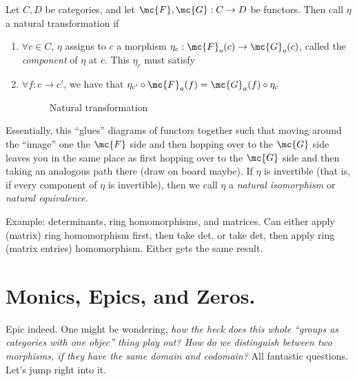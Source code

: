 \documentclass{fkbook}
\begin{document}
\begin{definition}
  Let $C,D$ be categories, and let $\mc{F}, \mc{G} : C \to D$ be
  functors. Then call $\eta$ a natural transformation if
  \begin{enumerate}[label=\arabic*)]
    \item $\forall c \in C$, $\eta$ assigns to $c$ a morphism $\eta_c
      : \mc{F}_o(c) \to \mc{G}_o(c)$, called the \emph{component} of
      $\eta$ at $c$. This $\eta_c$ must satisfy
    \item $\forall f : c \to c'$, we have that $\eta_{c'} \circ
      \mc{F}_a(f) = \mc{G}_a(f) \circ \eta_c$
      \begin{figure}[H]
        \centering
        \caption{Natural transformation}
      \end{figure}
  \end{enumerate}
\end{definition}
Essentially, this ``glues'' diagrams of functors together such that
moving around the ``image'' one the $\mc{F}$ side and then hopping
over to the $\mc{G}$ side leaves you in the same place as first
hopping over to the $\mc{G}$ side and then taking an analogous path
there (draw on board maybe). If $\eta$ is invertible (that is, if
every component of $\eta$ is invertible), then we call $\eta$ a
\emph{natural isomorphism} or \emph{natural equivalence}.

Example: determinants, ring homomorphisms, and matrices. Can either
apply (matrix) ring homomorphism first, then take det, or take det,
then apply ring (matrix entries) homomorphism. Either gets the same
result.

\section{Monics, Epics, and Zeros.}
Epic indeed. One might be wondering, \emph{how the heck does this
  whole ``groups as categories with one objec'' thing play out? How do
we distinguish between two morphisms, if they have the same domain and
codomain?} All fantastic questions. Let's jump right into it.
\end{document}
